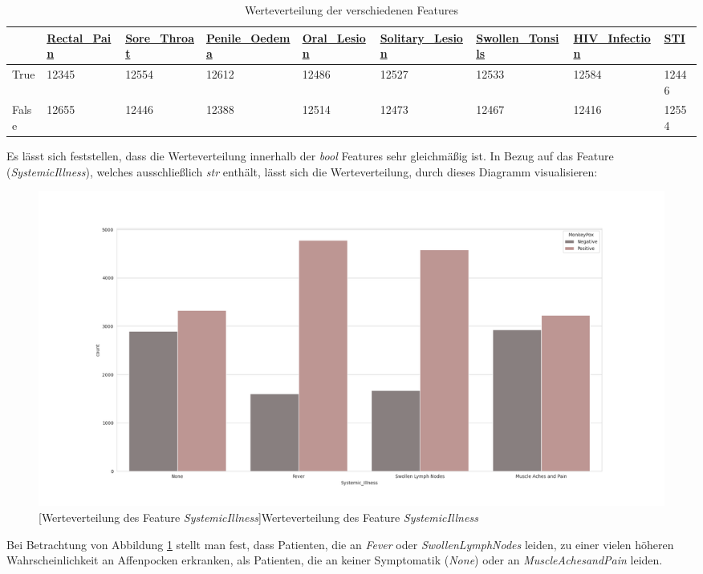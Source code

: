 \documentclass[13pt,a4paper, listof=entryprefix, bibliography=totocnumbered,toc=listofnumbered,lof=listofnumbered]{scrartcl}
\begin{document}
	\begin{singlespace}
	\begin{table}[H]
		\begin{adjustbox}{width=1\textwidth}
			\small
		\begin{tabular}{|l|l|l|l|l|l|l|l|l|}
			\hline  & \url{Rectal_Pain}&  \url{Sore_Throat}	& \url{Penile_Oedema} & \url{Oral_Lesion} & \url{Solitary_Lesion} &\url{Swollen_Tonsils} & \url{HIV_Infection} & \url{STI} \\
			\hline True & 12345 & 12554 & 12612 & 12486 & 12527 & 12533 & 12584  & 12446 \\
			\hline False & 12655 & 12446 & 12388& 12514 & 12473 & 12467 & 12416 & 12554\\
			\hline
		\end{tabular}
	\end{adjustbox}
		\caption{Werteverteilung der verschiedenen Features} %
		\label{tab:werteverteilung_features}
	\end{table}
\end{singlespace}
	

Es lässt sich feststellen, dass die Werteverteilung innerhalb der \textit{bool} Features sehr gleichmäßig ist. 
In Bezug auf das Feature (\textit{SystemicIllness}), welches ausschließlich \textit{str} enthält,  lässt sich die 
Werteverteilung, durch dieses Diagramm visualisieren: 

	\begin{figure}[H]
		\centering
		\includegraphics[width=0.8\linewidth]{Bilder/systemic_illness_plot.png}
		[Werteverteilung des Feature \textit{Systemic\textunderscore Illness}]{Werteverteilung des Feature \textit{Systemic\textunderscore Illness}}
		\label{fig:systemic_illness_plot}
	\end{figure}

Bei Betrachtung von Abbildung \ref{fig:systemic_illness_plot} stellt man fest, dass Patienten, die an \textit{Fever} oder \textit{Swollen\textunderscore Lymph\textunderscore Nodes} leiden, zu einer
vielen höheren Wahrscheinlichkeit an Affenpocken erkranken, als Patienten, die an keiner Symptomatik (\textit{None}) oder an \textit{Muscle\textunderscore Aches\textunderscore and\textunderscore Pain} leiden.
\end{document}
